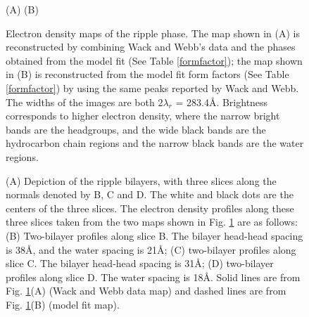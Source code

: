 \pagebreak

\begin{figure}
\begin{center}
\leavevmode
\raggedleft 
\hspace{0.5in}
\leavevmode
\raggedright 
\hspace{0.5in}
\end{center}
\vspace{-0.2in}
\hspace{1.5in} (A) \hspace{2.9in} (B)
\vspace{0.2in}
\caption{Electron density maps of the ripple phase. The map shown in (A)
is reconstructed by combining Wack and Webb's data and the phases obtained from
the model fit (See Table \ref{formfactor}); the map shown in (B) is 
reconstructed from 
the model fit form factors (See Table \ref{formfactor}) by using the 
same peaks reported by Wack and Webb. The widths of 
the images are both 2$\lambda_r$ = 283.4\AA. Brightness corresponds 
to higher electron density, where the narrow bright bands are the headgroups, 
and the wide black bands are the hydrocarbon chain regions and the narrow black 
bands are the water regions.
\label{wack_map}}
\end{figure}

\pagebreak

\begin{figure}
\begin{center}
\leavevmode
\raggedleft
\leavevmode
\raggedright
\hspace{0.35in}
\end{center}
\begin{center}
\leavevmode
\raggedleft
\leavevmode
\raggedright
\hspace{0.3in}
\end{center}
\caption{(A) Depiction of the ripple bilayers, with three slices along
the normals denoted by B, C and D. The white and black dots are the centers
of the three slices. The electron density profiles along 
these three slices taken from the two maps shown in Fig. \ref{wack_map}
are as follows: (B) Two-bilayer profiles along slice B. The bilayer head-head 
spacing is 38\AA, and the water spacing is 21\AA; (C) two-bilayer profiles 
along slice C. The bilayer head-head spacing is 31\AA; (D) two-bilayer 
profiles along slice D. The water spacing is 18\AA. Solid lines are from 
Fig. \ref{wack_map}(A) (Wack and Webb data map) and dashed lines are from 
Fig. \ref{wack_map}(B) (model fit map).
\label{slice}}
\end{figure}

